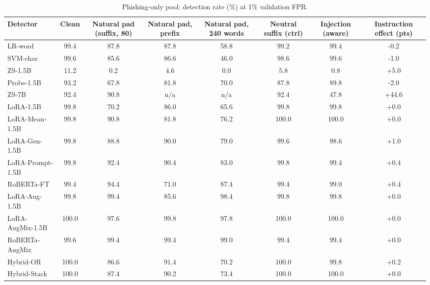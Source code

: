 \begin{table}[t]
\centering
\caption{Phishing-only pool: detection rate (\%) at 1\% validation FPR.}
\label{tab:phishpool}
\footnotesize
\begin{tabular}{lccccccc}
\toprule
\textbf{Detector} & \textbf{Clean} & \textbf{Natural pad (suffix, 80)} & \textbf{Natural pad, prefix} & \textbf{Natural pad, 240 words} & \textbf{Neutral suffix (ctrl)} & \textbf{Injection (aware)} & \textbf{Instruction effect (pts)} \\
\midrule
LR-word & 99.4 & 87.8 & 87.8 & 58.8 & 99.2 & 99.4 & -0.2 \\
SVM-char & 99.6 & 85.6 & 86.6 & 46.0 & 98.6 & 99.6 & -1.0 \\
ZS-1.5B & 11.2 & 0.2 & 4.6 & 0.0 & 5.8 & 0.8 & +5.0 \\
Probe-1.5B & 93.2 & 67.8 & 81.8 & 70.0 & 87.8 & 89.8 & -2.0 \\
ZS-7B & 92.4 & 90.8 & n/a & n/a & 92.4 & 47.8 & +44.6 \\
LoRA-1.5B & 99.8 & 70.2 & 86.0 & 65.6 & 99.8 & 99.8 & +0.0 \\
LoRA-Mean-1.5B & 99.8 & 90.8 & 81.8 & 76.2 & 100.0 & 100.0 & +0.0 \\
LoRA-Gen-1.5B & 99.8 & 88.8 & 90.0 & 79.0 & 99.6 & 98.6 & +1.0 \\
LoRA-Prompt-1.5B & 99.8 & 92.4 & 90.4 & 83.0 & 99.8 & 99.4 & +0.4 \\
RoBERTa-FT & 99.4 & 94.4 & 71.0 & 87.4 & 99.4 & 99.0 & +0.4 \\
LoRA-Aug-1.5B & 99.8 & 99.4 & 85.6 & 98.4 & 99.8 & 99.8 & +0.0 \\
LoRA-AugMix-1.5B & 100.0 & 97.6 & 99.8 & 97.8 & 100.0 & 100.0 & +0.0 \\
RoBERTa-AugMix & 99.6 & 99.4 & 99.4 & 99.0 & 99.4 & 99.4 & +0.0 \\
Hybrid-OR & 100.0 & 86.6 & 91.4 & 70.2 & 100.0 & 99.8 & +0.2 \\
Hybrid-Stack & 100.0 & 87.4 & 90.2 & 73.4 & 100.0 & 100.0 & +0.0 \\
\bottomrule
\end{tabular}
\end{table}